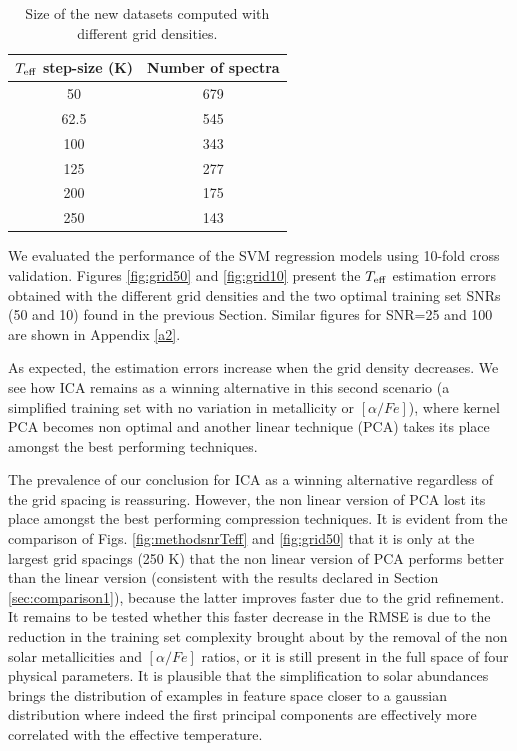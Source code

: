 \documentclass[a4paper,fleqn,usenatbib]{mnras}
\begin{document}
{\begin{table}
\centering
\caption{Size of the new datasets computed with different grid densities.}
\label{tab:grid}
\begin{tabular}{c c}
\hline
\textbf{$T_{\rm eff}$ step-size (K)} & \textbf{Number of spectra} \\
\hline
50 & 679 \\
62.5 & 545 \\
100 & 343 \\
125 & 277 \\
200 & 175\\
250 & 143\\
\hline
\end{tabular}
\end{table}

We evaluated the performance of the SVM regression models using
10-fold cross validation. Figures \ref{fig:grid50} and
\ref{fig:grid10} present the $T_{\rm eff}$ estimation errors obtained
with the different grid densities and the two optimal training set
SNRs (50 and 10) found in the previous Section. Similar 
figures for SNR=25 and 100 are shown in Appendix \ref{a2}.

As expected, the estimation errors increase when the grid 
density decreases. We see how ICA remains as a winning 
alternative in this second scenario (a simplified training 
set with no variation in metallicity or $\left[ \alpha/Fe \right]$), 
where kernel PCA becomes non optimal and another linear 
technique (PCA) takes its place amongst the best performing 
techniques. 

The prevalence of our conclusion for ICA as a winning alternative 
regardless of the grid spacing is reassuring. However, the non linear 
version of PCA lost its place amongst the best 
performing compression techniques. It is 
evident from the comparison of Figs. \ref{fig:methodsnrTeff} and 
\ref{fig:grid50} that it is only at the largest grid spacings (250 K) 
that the non linear version of PCA performs better than the linear 
version (consistent with the results declared in Section 
\ref{sec:comparison1}), because the latter improves faster due to 
the grid refinement. It remains to be tested whether this faster 
decrease in the RMSE is due to the 
reduction in the training set complexity brought about by the removal 
of the non solar metallicities and $\left[ \alpha/Fe \right]$ ratios, 
or it is still present in the full space of four physical parameters. 
It is plausible that the simplification to solar abundances brings the 
distribution of examples in feature space closer to a gaussian distribution 
where indeed the first principal components are effectively more 
correlated with the effective temperature.

}
\end{document}
